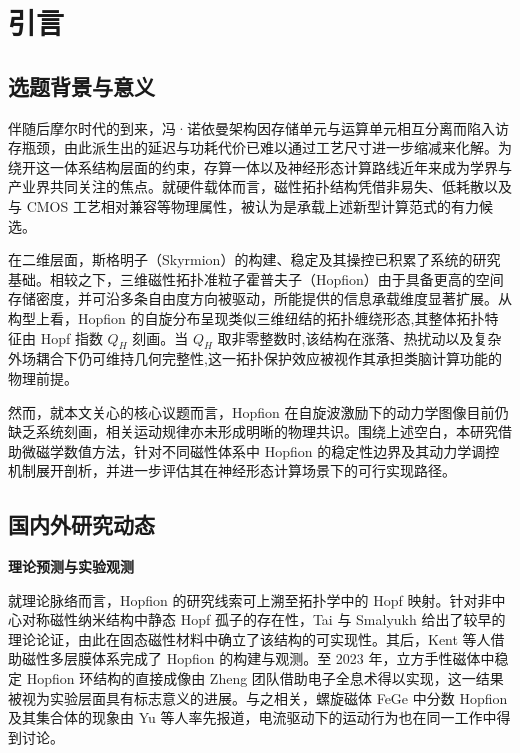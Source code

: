 \chapter{引言}

\section{选题背景与意义}

伴随后摩尔时代的到来，冯·诺依曼架构因存储单元与运算单元相互分离而陷入访存瓶颈，由此派生出的延迟与功耗代价已难以通过工艺尺寸进一步缩减来化解。为绕开这一体系结构层面的约束，存算一体以及神经形态计算路线近年来成为学界与产业界共同关注的焦点。就硬件载体而言，磁性拓扑结构凭借非易失、低耗散以及与 CMOS 工艺相对兼容等物理属性，被认为是承载上述新型计算范式的有力候选。

在二维层面，斯格明子（Skyrmion）的构建、稳定及其操控已积累了系统的研究基础。相较之下，三维磁性拓扑准粒子霍普夫子（Hopfion）由于具备更高的空间存储密度，并可沿多条自由度方向被驱动\cite{gobel2021beyond}，所能提供的信息承载维度显著扩展。从构型上看，Hopfion 的自旋分布呈现类似三维纽结的拓扑缠绕形态,其整体拓扑特征由 Hopf 指数 $Q_H$ 刻画。当 $Q_H$ 取非零整数时,该结构在涨落、热扰动以及复杂外场耦合下仍可维持几何完整性,这一拓扑保护效应被视作其承担类脑计算功能的物理前提\cite{guslienko2024review}。

然而，就本文关心的核心议题而言，Hopfion 在自旋波激励下的动力学图像目前仍缺乏系统刻画，相关运动规律亦未形成明晰的物理共识。围绕上述空白，本研究借助微磁学数值方法，针对不同磁性体系中 Hopfion 的稳定性边界及其动力学调控机制展开剖析，并进一步评估其在神经形态计算场景下的可行实现路径。


\section{国内外研究动态}

\par\noindent\textbf{理论预测与实验观测}\par\nobreak

就理论脉络而言，Hopfion 的研究线索可上溯至拓扑学中的 Hopf 映射。针对非中心对称磁性纳米结构中静态 Hopf 孤子的存在性，Tai 与 Smalyukh 给出了较早的理论论证\cite{tai2018static}，由此在固态磁性材料中确立了该结构的可实现性。其后，Kent 等人借助磁性多层膜体系完成了 Hopfion 的构建与观测\cite{kent2021creation}。至 2023 年，立方手性磁体中稳定 Hopfion 环结构的直接成像由 Zheng 团队借助电子全息术得以实现\cite{zheng2023hopfion}，这一结果被视为实验层面具有标志意义的进展。与之相关，螺旋磁体 FeGe 中分数 Hopfion 及其集合体的现象由 Yu 等人率先报道，电流驱动下的运动行为也在同一工作中得到讨论\cite{yu2023realization}。

